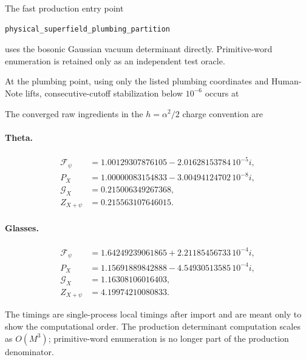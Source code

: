 \documentclass[11pt]{article}
\begin{document}
The fast production entry point

\begin{verbatim}
physical_superfield_plumbing_partition
\end{verbatim}

uses the bosonic Gaussian vacuum determinant directly.  Primitive-word
enumeration is retained only as an independent test oracle.

At the \texttt{} plumbing point, using only the listed plumbing
coordinates and Human-Note lifts, consecutive-cutoff stabilization below
\(10^{-6}\) occurs at

\begin{center}
\small
{}
\end{center}

The converged raw ingredients in the \(h=\alpha^2/2\) charge convention are

\paragraph{Theta.}
\[
\begin{aligned}
\mathcal F_\psi&=1.00129307876105-2.01628153784\,10^{-5}i,\\
P_X&=1.00000083154833-3.00494124702\,10^{-8}i,\\
\mathcal G_X&=0.215006349267368,\\
Z_{X+\psi}&=0.215563107646015.
\end{aligned}
\]

\paragraph{Glasses.}
\[
\begin{aligned}
\mathcal F_\psi&=1.64249239061865+2.21185456733\,10^{-4}i,\\
P_X&=1.15691889842888-4.54930513585\,10^{-4}i,\\
\mathcal G_X&=1.16308106016403,\\
Z_{X+\psi}&=4.19974210080833.
\end{aligned}
\]

The timings are single-process local timings after import and are meant only
to show the computational order.  The production determinant computation
scales as \(O(M^3)\); primitive-word enumeration is no longer part of the
production denominator.
\end{document}
